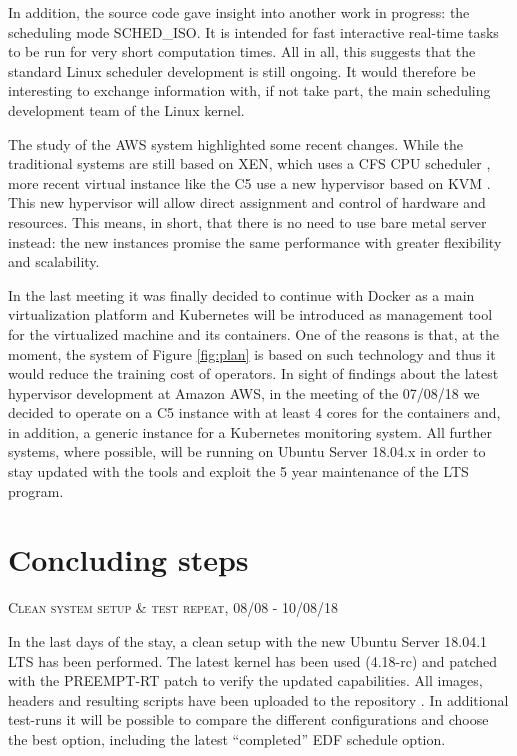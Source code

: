 \documentclass[]{scrartcl}
\begin{document}
In addition, the source code gave insight into another work in progress: the scheduling mode SCHED\_ISO. It is intended for fast interactive real-time tasks to be run for very short computation times. All in all, this suggests that the standard Linux scheduler  development is still ongoing.
It would therefore be interesting to exchange information with, if not take part, the main scheduling development team of the Linux kernel.

The study of the AWS system highlighted some recent changes. While the traditional systems are still based on XEN, which uses a CFS CPU scheduler \cite{xen01}, more recent virtual instance like the C5 use a new hypervisor based on KVM \cite{amazon01}.
This new hypervisor will allow direct assignment and control of hardware and resources.
This means, in short, that there is no need to use bare metal server instead: the new instances promise the same performance with greater flexibility and scalability.

In the last meeting it was finally decided to continue with Docker as a main virtualization platform and Kubernetes will be introduced as management tool for the virtualized machine and its containers.
One of the reasons is that, at the moment, the system of Figure \ref{fig:plan} is based on such technology and thus it would reduce the training cost of operators.
In sight of findings about the latest hypervisor development at Amazon AWS, in the meeting of the 07/08/18 we decided to operate on a C5 instance with at least 4 cores for the containers and, in addition, a generic instance for a Kubernetes monitoring system.
All further systems, where possible, will be running on Ubuntu Server 18.04.x in order to stay updated with the tools and exploit the 5 year maintenance of the LTS program.

\section{Concluding steps}

{\small\textsc{Clean system setup \& test repeat, 08/08 - 10/08/18} \bigskip}

In the last days of the stay, a clean setup with the new Ubuntu Server 18.04.1 LTS has been performed. The latest kernel has been used (4.18-rc) and patched with the PREEMPT-RT patch to verify the updated capabilities. 
All images, headers and resulting scripts have been uploaded to the repository \cite{gitrepo}. In additional test-runs it will be possible to compare the different configurations and choose the best option, including the latest ``completed'' EDF schedule option.
\end{document}
